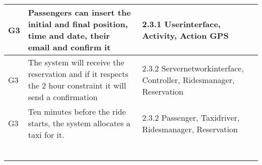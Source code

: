 \begin{center}
\begin{longtable}{| m{5cm} | m{5cm} | m{5cm} | }
    G3& Passengers can insert the initial and final position, time and date, their email and confirm it & 2.3.1 Userinterface, Activity, Action \newline 2.1 GPS\\ \hline
    G3&The system will receive the reservation and if it respects the 2 hour constraint it will send a confirmation & 2.3.2 Servernetworkinterface, Controller, Ridesmanager, Reservation \\ \hline
    G3&Ten minutes before the ride starts, the system allocates a taxi for it.  & 2.3.2 Passenger, Taxidriver, Ridesmanager, Reservation\\ \hline
     &  & \\ \hline
     &  & \\ \hline
     &  & \\ \hline
     &  & \\ \hline
     &  & \\ \hline
     &  & \\ \hline
 \end{longtable}
\end{center}
